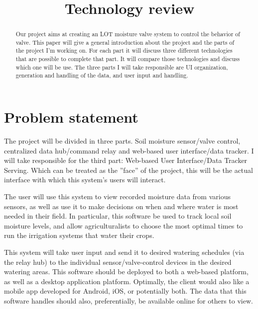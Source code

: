 \documentclass[10pt,onecolumn,journal,draftclsnofoot]{IEEEtran}
\begin{document}
\begin{titlepage}
\title{Technology review}
\author
{
}
	\maketitle
	\vspace{4cm}
\begin{abstract}
  Our project aims at creating an LOT moisture valve system to control the behavior of valve. This paper will give a general introduction about the project and the parts of the project I’m working on. For each part it will discuss three different technologies that are possible to complete that part. It will compare those technologies and discuss which one will be use. The three parts I will take responsible are UI organization, generation and handling of the data, and user input and handling.
\end{abstract}

\end{titlepage}

\newpage
	\newpage
	\tableofcontents
	\clearpage
	
	\section{Problem statement}
	\par 
	The project will be divided in three parts. Soil moisture sensor/valve control, centralized data hub/command relay and web-based user interface/data tracker. I will take responsible for the third part: Web-based User Interface/Data Tracker Serving. Which can be treated as the ”face” of the project, this will be the actual interface with which this system’s users will interact.
	\par 
	The user will use this system to view recorded moisture data from various sensors, as well as use it to make decisions on when and where water is most needed in their ﬁeld. In particular, this software be used to track local soil moisture levels, and allow agriculturalists to choose the most optimal times to run the irrigation systems that water their crops. 
	\par 
	This system will take user input and send it to desired watering schedules (via the relay hub) to the individual sensor/valve-control devices in the desired watering areas. This software should be deployed to both a web-based platform, as well as a desktop application platform. Optimally, the client would also like a mobile app developed for Android, iOS, or potentially both. The data that this software handles should also, preferentially, be available online for others to view.    
\end{document}
